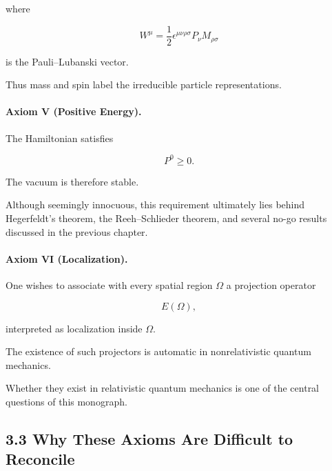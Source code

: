 where

\begin{equation}
W^\mu
=
\frac12
\epsilon^{\mu\nu\rho\sigma}
P_\nu
M_{\rho\sigma}
\end{equation}

is the Pauli--Lubanski vector.

Thus mass and spin label the irreducible particle representations.


\paragraph{Axiom V (Positive Energy).}

The Hamiltonian satisfies

\begin{equation}
P^0\ge0.
\end{equation}

The vacuum is therefore stable.

Although seemingly innocuous, this requirement ultimately lies behind
Hegerfeldt's theorem, the Reeh--Schlieder theorem, and several no-go results
discussed in the previous chapter.


\paragraph{Axiom VI (Localization).}

One wishes to associate with every spatial region $\Omega$ a projection
operator

\begin{equation}
E(\Omega),
\end{equation}

interpreted as localization inside $\Omega$.

The existence of such projectors is automatic in nonrelativistic quantum
mechanics.

Whether they exist in relativistic quantum mechanics is one of the central
questions of this monograph.


\subsection{3.3 Why These Axioms Are Difficult to Reconcile}

